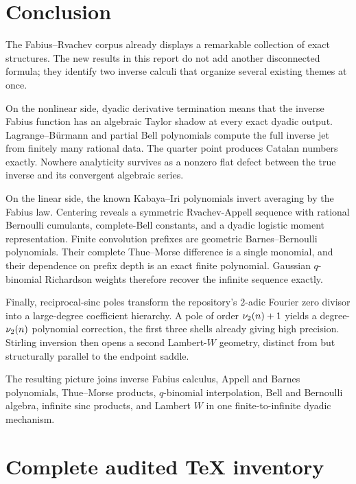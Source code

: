 \documentclass[11pt,oneside]{article}
\numberwithin{equation}{section}
\theoremstyle{definition}
\theoremstyle{remark}
\begin{document}
\section{Conclusion}

The Fabius--Rvachev corpus already displays a remarkable collection of exact structures.  The new
results in this report do not add another disconnected formula; they identify two inverse calculi
that organize several existing themes at once.

On the nonlinear side, dyadic derivative termination means that the inverse Fabius function has an
algebraic Taylor shadow at every exact dyadic output.  Lagrange--B\"urmann and partial Bell
polynomials compute the full inverse jet from finitely many rational data.  The quarter point produces
Catalan numbers exactly.  Nowhere analyticity survives as a nonzero flat defect between the true
inverse and its convergent algebraic series.

On the linear side, the known Kabaya--Iri polynomials invert averaging by the Fabius law.  Centering
reveals a symmetric Rvachev-Appell sequence with rational Bernoulli cumulants, complete-Bell
constants, and a dyadic logistic moment representation.  Finite convolution prefixes are geometric
Barnes--Bernoulli polynomials.  Their complete Thue--Morse difference is a single monomial, and
their dependence on prefix depth is an exact finite polynomial.  Gaussian $q$-binomial Richardson
weights therefore recover the infinite sequence exactly.

Finally, reciprocal-sinc poles transform the repository's $2$-adic Fourier zero divisor into a
large-degree coefficient hierarchy.  A pole of order $\nu_2(n)+1$ yields a degree-$\nu_2(n)$
polynomial correction, the first three shells already giving high precision.  Stirling inversion then
opens a second Lambert-$W$ geometry, distinct from but structurally parallel to the endpoint saddle.

The resulting picture joins inverse Fabius calculus, Appell and Barnes polynomials, Thue--Morse
products, $q$-binomial interpolation, Bell and Bernoulli algebra, infinite sinc products, and Lambert
$W$ in one finite-to-infinite dyadic mechanism.

\appendix

\section{Complete audited TeX inventory}
\label{p2:app:inventory}
\end{document}
